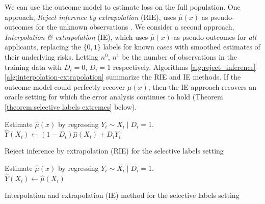 \documentclass{article}
\begin{document}
We can use the outcome model to estimate loss on the full population. One approach, \emph{Reject inference by extrapolation} (RIE), uses $\hat{\mu}(x)$ as pseudo-outcomes for the unknown observations \cite{crook2004does}.
We consider a second approach,
\emph{Interpolation \& extrapolation} (IE), which uses $\hat{\mu}(x)$ as pseudo-outcomes for \emph{all} applicants, replacing the $\{0,1\}$ labels for known cases with smoothed estimates of their underlying risks.
Letting $n^0$, $n^1$ be the number of observations in the training data with $D_i = 0$, $D_i = 1$ respectively, Algorithms \ref{alg:reject_inference}-\ref{alg:interpolation-extrapolation} summarize the RIE and IE methods. 
If the outcome model could perfectly recover $\mu(x)$, then the IE approach recovers an oracle setting for which the \fairs error analysis %
continues to hold (Theorem \ref{theorem:selective labels extremes} below).

\begin{algorithm}[htbp!]
Estimate $\hat \mu(x)$ by regressing $Y_i \sim X_i \mid D_i = 1$.\\
$\hat{Y}(X_i) \leftarrow (1-D_i) \hat \mu(X_i) + D_i Y_i$ \\
\caption{Reject inference by extrapolation (RIE) for the selective labels setting}
\label{alg:reject_inference}
\end{algorithm}

\begin{algorithm}[htbp!]
Estimate $\hat \mu(x)$ by regressing $Y_i \sim X_i \mid D_i = 1$.\\
$\hat{Y}(X_i) \leftarrow \hat{\mu}(X_i)$ \\
\caption{Interpolation and extrapolation (IE) method for the selective labels setting}
\label{alg:interpolation-extrapolation}
\end{algorithm}
\end{document}
